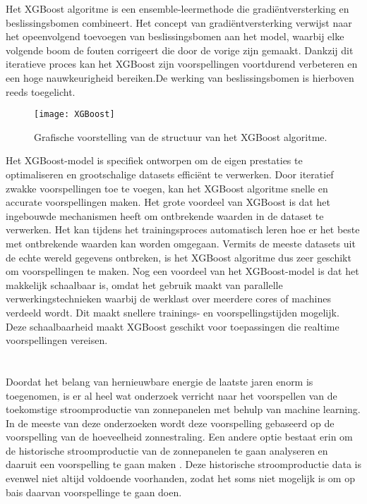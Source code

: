 Het XGBoost algoritme is een ensemble-leermethode die gradiëntversterking en beslissingsbomen combineert. Het concept van gradiëntversterking verwijst naar het opeenvolgend toevoegen van beslissingsbomen aan het model, waarbij elke volgende boom de fouten corrigeert die door de vorige zijn gemaakt. Dankzij dit iteratieve proces kan het XGBoost zijn voorspellingen voortdurend verbeteren en een hoge nauwkeurigheid bereiken.De werking van beslissingsbomen is hierboven reeds toegelicht. \\

\begin{figure}[h!]
    \centering\texttt{[image: XGBoost]}
    \caption{\label{fig:XGBoost}Grafische voorstelling van de structuur van het XGBoost algoritme.}
\end{figure} 

Het XGBoost-model is specifiek ontworpen om de eigen prestaties te optimaliseren en grootschalige datasets efficiënt te verwerken. Door iteratief zwakke voorspellingen toe te voegen, kan het XGBoost algoritme snelle en accurate voorspellingen maken. Het grote voordeel van XGBoost is dat het ingebouwde mechanismen heeft om ontbrekende waarden in de dataset te verwerken. Het kan tijdens het trainingsproces automatisch leren hoe er het beste met ontbrekende waarden kan worden omgegaan. Vermits de meeste datasets uit de echte wereld gegevens ontbreken, is het XGBoost algoritme dus zeer geschikt om voorspellingen te maken. Nog een voordeel van het XGBoost-model is dat het makkelijk schaalbaar is, omdat het gebruik maakt van parallelle verwerkingstechnieken waarbij de werklast over meerdere cores of machines verdeeld wordt. Dit maakt snellere trainings- en voorspellingstijden mogelijk. Deze schaalbaarheid maakt XGBoost geschikt voor toepassingen die realtime voorspellingen vereisen.

\section{}%
\label{sec:elektriciteitsproductie voorspellen}

Doordat het belang van hernieuwbare energie de laatste jaren enorm is toegenomen, is er al heel wat onderzoek verricht naar het voorspellen van de toekomstige stroomproductie van zonnepanelen met behulp van machine learning. In de meeste van deze onderzoeken wordt deze voorspelling gebaseerd op de voorspelling van de hoeveelheid zonnestraling. Een andere optie bestaat erin om de historische stroomproductie van de zonnepanelen te gaan analyseren en daaruit een voorspelling te gaan maken \autocite{Wang2022}. Deze historische stroomproductie data is evenwel niet altijd voldoende voorhanden, zodat het soms niet mogelijk is om op bais daarvan voorspellinge te gaan doen.


